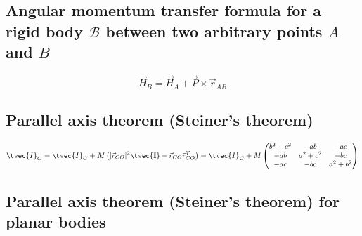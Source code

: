 \documentclass[10pt,a4paper]{scrartcl}
\begin{document}
\begin{multicols*}{2}
\subsection{Angular momentum transfer formula for a rigid body $\mathcal{B}$ between two arbitrary points $A$ and $B$}

\begin{equation*}
\vec{H}_B=\vec{H}_A+\vec{P}\times\vec{r}_{AB}
\end{equation*}


\subsection{Parallel axis theorem (Steiner's theorem)}

\begin{equation*}
\tvec{I}_O=\tvec{I}_C+M\left(|\vec{r}_{CO}|^2\tvec{\mathbb{I}}-\vec{r}_{CO}\vec{r}_{CO}^T\right)=\tvec{I}_C+M\begin{pmatrix}b^2+c^2&-ab&-ac\\-ab&a^2+c^2&-bc\\-ac&-bc&a^2+b^2\end{pmatrix}
\end{equation*}


\subsection{Parallel axis theorem (Steiner's theorem) for planar bodies}


\end{multicols*}
\end{document}

